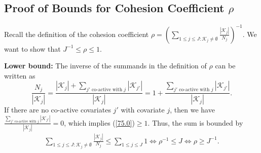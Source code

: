 \documentclass[11pt]{article}
\newcommand{\oo}{\bm{1}}
\newcommand{\indep}{\rotatebox[origin=c]{90}{$\models$}}
\begin{document}
	\iffalse
	For $X\sim \mathcal{N}(0,1)$, given $V\sim\chi^2_d$ and $V\indep X$, we would have $\tau=X/\sqrt{V/d}\sim t_{d}$ per \cite[Chapter~5.2]{lehmann2005testing}. Now consider $Z:=X\oo\{X\in [a/\|\eta \|\sigma,b/\|\eta \|\sigma]\}$ and let us investigate the new quotient random variable
	\begin{equation}
		\tilde{\tau}=\frac{Z}{\sqrt{V/ d}}=
		\frac{X}{\sqrt{V/d}}
		\oo\{X\in [a/\|\eta \|\sigma,b/\|\eta \|\sigma]\}
	\end{equation}
	Thus $\tilde{\tau}\sim \mathcal{TT}_{d;[a/\|\eta \|\sigma,b/\|\eta \|\sigma]}$ and it fits our construction of $\bar{\beta}_i/\hat{\sigma}$:
	\begin{equation}
		\frac{\bar{\beta}_i}{
			\|\eta \|\hat{\sigma}}\stackrel{D}{=}\frac{\bar{\beta}_i}{
			\|\eta \|\sigma\sqrt{V/d}}\stackrel{D}{=}\frac{Z}{\sqrt{V/d}}
	\end{equation}
	\fi
	
	
	
	\subsection{Proof of Bounds for Cohesion Coefficient $\rho$}\label{app-sec:proof_bonf_global}
	
	Recall the definition of the cohesion coefficient $\rho =\left(\sum_{1\leq j\leq J:\mathcal{K}_j\neq\emptyset}\frac{|\mathcal{K}_j|}{N_j}   \right)^{-1}$. We want to show that $J^{-1}\leq \rho\leq 1$.
	
	\textbf{Lower bound: }The inverse of the summands in the definition of $\rho$ can be written as
	\begin{equation}\label{75.0}
		\frac{N_j}{|\mathcal{K}_j|}=\frac{|\mathcal{K}_j|+\sum_{j'\textrm{ co-active with }j}|\mathcal{K}_{j'}|}{|\mathcal{K}_j|}
		=1+\frac{\sum_{j'\textrm{ co-active with }j}|\mathcal{K}_{j'}|}{|\mathcal{K}_j|}.
	\end{equation}
	If there are no co-active covariates $j'$ with covariate $j$, then we have $\frac{\sum_{j'\textrm{ co-active with }j}|\mathcal{K}_{j'}|}{|\mathcal{K}_j|}=0$, which implies (\ref{75.0})$\geq 1$. Thus, the sum is bounded by
	\begin{equation}\label{eq:11}
		\begin{split}
			\sum_{1\leq j\leq J:\mathcal{K}_j\neq\emptyset}\frac{|\mathcal{K}_j|}{N_j}\leq 
			\sum_{1\leq j\leq J}1    \iff
			\rho^{-1}\leq 
			J \iff
			\rho\geq  J^{-1}.
		\end{split}
	\end{equation}
	
\end{document}
